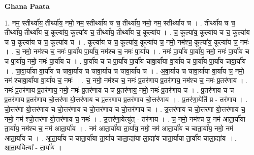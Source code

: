 \documentclass[17pt]{extarticle}
\begin{document}
\textbf{Ghana Paata } \newline

1. नम॒ स्तीर्थ्या॑य॒ तीर्थ्या॑य॒ नमो॒ नम॒ स्तीर्थ्या॑य च च॒ तीर्थ्या॑य॒ नमो॒ नम॒ स्तीर्थ्या॑य च । . तीर्थ्या॑य च च॒ तीर्थ्या॑य॒ तीर्थ्या॑य च॒ कूल्या॑य॒ कूल्या॑य च॒ तीर्थ्या॑य॒ तीर्थ्या॑य च॒ कूल्या॑य । . च॒ कूल्या॑य॒ कूल्या॑य च च॒ कूल्या॑य च च॒ कूल्या॑य च च॒ कूल्या॑य च । . कूल्या॑य च च॒ कूल्या॑य॒ कूल्या॑य च॒ नमो॒ नम॑श्च॒ कूल्या॑य॒ कूल्या॑य च॒ नमः॑ । . च॒ नमो॒ नम॑श्च च॒ नमः॑ पा॒र्या॑य पा॒र्या॑य॒ नम॑श्च च॒ नमः॑ पा॒र्या॑य । . नमः॑ पा॒र्या॑य पा॒र्या॑य॒ नमो॒ नमः॑ पा॒र्या॑य च च पा॒र्या॑य॒ नमो॒ नमः॑ पा॒र्या॑य च । . पा॒र्या॑य च च पा॒र्या॑य पा॒र्या॑य चावा॒र्या॑या वा॒र्या॑य च पा॒र्या॑य पा॒र्या॑य चावा॒र्या॑य । . चा॒वा॒र्या॑या वा॒र्या॑य च चावा॒र्या॑य च चावा॒र्या॑य च चावा॒र्या॑य च । . अ॒वा॒र्या॑य च चावा॒र्या॑या वा॒र्या॑य च॒ नमो॒ नम॑ श्चावा॒र्या॑या वा॒र्या॑य च॒ नमः॑ । . च॒ नमो॒ नम॑श्च च॒ नमः॑ प्र॒तर॑णाय प्र॒तर॑णाय॒ नम॑श्च च॒ नमः॑ प्र॒तर॑णाय । . नमः॑ प्र॒तर॑णाय प्र॒तर॑णाय॒ नमो॒ नमः॑ प्र॒तर॑णाय च च प्र॒तर॑णाय॒ नमो॒ नमः॑ प्र॒तर॑णाय च । . प्र॒तर॑णाय च च प्र॒तर॑णाय प्र॒तर॑णाय चो॒त्तर॑णा यो॒त्तर॑णाय च प्र॒तर॑णाय प्र॒तर॑णाय चो॒त्तर॑णाय । . प्र॒तर॑णा॒येति॑ प्र - तर॑णाय । . चो॒त्तर॑णा यो॒त्तर॑णाय च चो॒त्तर॑णाय च चो॒त्तर॑णाय च चो॒त्तर॑णाय च । . उ॒त्तर॑णाय च चो॒त्तर॑णा यो॒त्तर॑णाय च॒ नमो॒ नम॑ श्चो॒त्तर॑णा यो॒त्तर॑णाय च॒ नमः॑ । . उ॒त्तर॑णा॒येत्यु॑त् - तर॑णाय । . च॒ नमो॒ नम॑श्च च॒ नम॑ आता॒र्या॑या ता॒र्या॑य॒ नम॑श्च च॒ नम॑ आता॒र्या॑य । . नम॑ आता॒र्या॑या ता॒र्या॑य॒ नमो॒ नम॑ आता॒र्या॑य च चाता॒र्या॑य॒ नमो॒ नम॑ आता॒र्या॑य च । . आ॒ता॒र्या॑य च चाता॒र्या॑या ता॒र्या॑य चाला॒द्या॑या ला॒द्या॑य चाता॒र्या॑या ता॒र्या॑य चाला॒द्या॑य । . आ॒ता॒र्या॑येत्या᳚ - ता॒र्या॑य । \newline
\end{document}
